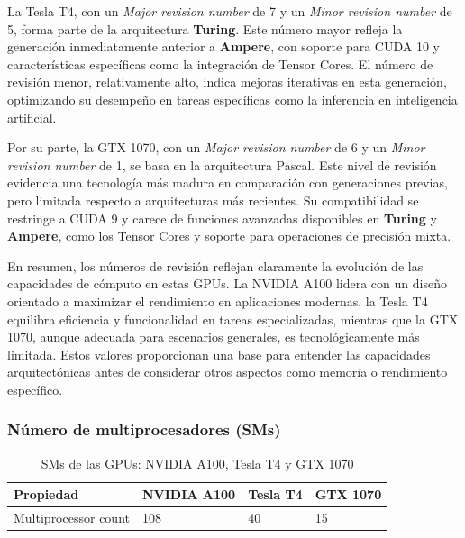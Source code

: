 \documentclass{article}
\begin{document}
			La Tesla T4, con un \textit{Major revision number} de 7 y un \textit{Minor revision number} de 5, forma parte de la arquitectura \textbf{Turing}. Este número mayor refleja la generación inmediatamente anterior a \textbf{Ampere}, con soporte para CUDA 10 y características específicas como la integración de Tensor Cores. El número de revisión menor, relativamente alto, indica mejoras iterativas en esta generación, optimizando su desempeño en tareas específicas como la inferencia en inteligencia artificial.

			Por su parte, la GTX 1070, con un \textit{Major revision number} de 6 y un \textit{Minor revision number} de 1, se basa en la arquitectura Pascal. Este nivel de revisión evidencia una tecnología más madura en comparación con generaciones previas, pero limitada respecto a arquitecturas más recientes. Su compatibilidad se restringe a CUDA 9 y carece de funciones avanzadas disponibles en \textbf{Turing} y \textbf{Ampere}, como los Tensor Cores y soporte para operaciones de precisión mixta.

			En resumen, los números de revisión reflejan claramente la evolución de las capacidades de cómputo en estas GPUs. La NVIDIA A100 lidera con un diseño orientado a maximizar el rendimiento en aplicaciones modernas, la Tesla T4 equilibra eficiencia y funcionalidad en tareas especializadas, mientras que la GTX 1070, aunque adecuada para escenarios generales, es tecnológicamente más limitada. Estos valores proporcionan una base para entender las capacidades arquitectónicas antes de considerar otros aspectos como memoria o rendimiento específico.

		\subsubsection{Número de multiprocesadores (SMs)}

			\begin{table}[H]
				\begin{adjustbox}{width=\textwidth, keepaspectratio}
					\begin{tabular}{|l|l|l|l|}
						\hline
						\textbf{Propiedad} & \textbf{NVIDIA A100} & \textbf{Tesla T4} & \textbf{GTX 1070} \\ \hline
						Multiprocessor count & 108 & 40 & 15 \\ \hline
					\end{tabular}
				\end{adjustbox}
				\centering
				\caption{SMs de las GPUs: NVIDIA A100, Tesla T4 y GTX 1070}
			\end{table}
\end{document}
